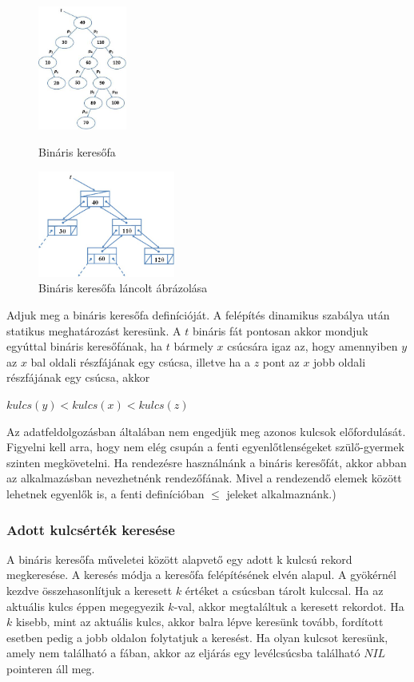 \documentclass[12pt,margin=0px]{article}
\begin{document}
	\begin{figure}[H]
		\centering
        \includegraphics[width=0.26\textwidth]{img/bin_tree_sample1.png}
		\caption{Bináris keresőfa}
		\includegraphics[width=0.4\textwidth]{img/bin_tree_sample2.png}
        \caption{Bináris keresőfa láncolt ábrázolása}
	\end{figure}

    \noindent Adjuk meg a bináris keresőfa definícióját. A felépítés dinamikus szabálya után statikus meghatározást keresünk. A $t$ bináris fát pontosan akkor mondjuk egyúttal bináris keresőfának, ha $t$ bármely $x$ csúcsára igaz az, hogy amennyiben $y$ az $x$ bal oldali részfájának egy csúcsa, illetve ha a $z$ pont az $x$ jobb oldali részfájának egy csúcsa, akkor
    \begin{center}
      $kulcs(y) < kulcs(x) < kulcs(z)$
    \end{center}
    Az adatfeldolgozásban általában nem engedjük meg azonos kulcsok előfordulását. Figyelni kell arra, hogy nem elég csupán a fenti egyenlőtlenségeket szülő-gyermek szinten megkövetelni. Ha rendezésre használnánk a bináris keresőfát, akkor abban az alkalmazásban nevezhetnénk rendezőfának. Mivel a rendezendő elemek között lehetnek egyenlők is, a fenti definícióban $\leq$ jeleket alkalmaznánk.)

    \subsubsection*{Adott kulcsérték keresése}

    \noindent A bináris keresőfa műveletei között alapvető egy adott k kulcsú rekord megkeresése. A keresés módja a keresőfa felépítésének elvén alapul. A gyökérnél kezdve összehasonlítjuk a keresett $k$ értéket a csúcsban tárolt kulccsal. Ha az aktuális kulcs éppen megegyezik $k$-val, akkor megtaláltuk a keresett rekordot. Ha $k$ kisebb, mint az aktuális kulcs, akkor balra lépve keresünk tovább, fordított esetben pedig a jobb oldalon folytatjuk a keresést. Ha olyan kulcsot keresünk, amely nem található a fában, akkor az eljárás egy levélcsúcsba található $NIL$ pointeren áll meg.
\end{document}
